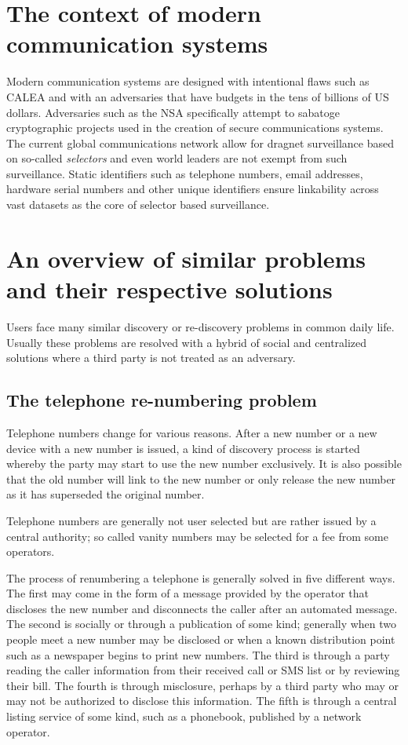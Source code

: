 \documentclass[letterpaper,twocolumn,10pt]{article}
\begin{document}
\section{The context of modern communication systems}
\label{sec:context}

Modern communication systems are designed with intentional flaws such as
CALEA\cite{CALEA} and with an adversaries that have budgets in the tens of
billions of US dollars\cite{NSABUDGET}. Adversaries such as the NSA
specifically attempt to sabatoge cryptographic projects\cite{BULLRUN} used in
the creation of secure communications systems. The current global
communications network allow for dragnet surveillance based on so-called {\it
selectors} and even world leaders\cite{MERKELPHONE} are not exempt from such
surveillance. Static identifiers such as telephone numbers, email addresses,
hardware serial numbers and other unique identifiers ensure linkability across
vast datasets as the core of selector based surveillance.

\section{An overview of similar problems and their respective solutions}

Users face many similar discovery or re-discovery problems in common daily
life. Usually these problems are resolved with a hybrid of social and
centralized solutions where a third party is not treated as an adversary.

\subsection{The telephone re-numbering problem}
\label{renumber:telephone}

Telephone numbers change for various reasons. After a new number or a new
device with a new number is issued, a kind of discovery process is started
whereby the party may start to use the new number exclusively. It is also
possible that the old number will link to the new number or only release the
new number as it has superseded the original number.

Telephone numbers are generally not user selected but are rather issued by a
central authority; so called vanity numbers may be selected for a fee from
some operators.

The process of renumbering a telephone is generally solved in five different
ways. The first may come in the form of a message provided by the operator
that discloses the new number and disconnects the caller after an automated
message. The second is socially or through a publication of some kind;
generally when two people meet a new number may be disclosed or when a known
distribution point such as a newspaper begins to print new numbers. The third
is through a party reading the caller information from their received call or
SMS list or by reviewing their bill. The fourth is through
misclosure\cite{kellycaine}, perhaps by a third party who may or may not be
authorized to disclose this information. The fifth is through a central listing
service of some kind, such as a phonebook, published by a network operator.
\end{document}
